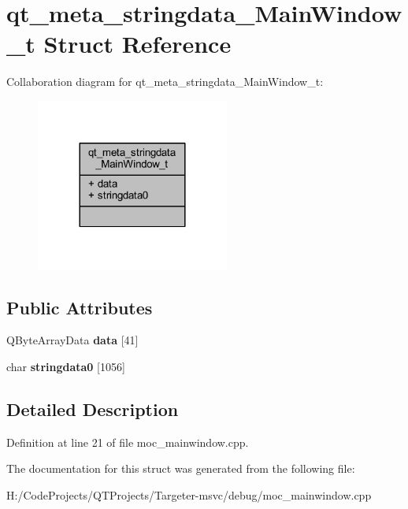 \hypertarget{structqt__meta__stringdata___main_window__t}{}\section{qt\+\_\+meta\+\_\+stringdata\+\_\+\+Main\+Window\+\_\+t Struct Reference}
\label{structqt__meta__stringdata___main_window__t}


Collaboration diagram for qt\+\_\+meta\+\_\+stringdata\+\_\+\+Main\+Window\+\_\+t\+:
\nopagebreak
\begin{figure}[H]
\begin{center}
\leavevmode
\includegraphics[width=180pt]{structqt__meta__stringdata___main_window__t__coll__graph}
\end{center}
\end{figure}
\subsection*{Public Attributes}
\begin{DoxyCompactItemize}
\item 
\mbox{\label{structqt__meta__stringdata___main_window__t_a1da75c3fb4448f99b656a5ca7a65897f}} 
Q\+Byte\+Array\+Data {\bfseries data} \mbox{[}41\mbox{]}
\item 
\mbox{\label{structqt__meta__stringdata___main_window__t_a839d87a6c9288dacfc295a89c4c212fd}} 
char {\bfseries stringdata0} \mbox{[}1056\mbox{]}
\end{DoxyCompactItemize}


\subsection{Detailed Description}


Definition at line 21 of file moc\+\_\+mainwindow.\+cpp.



The documentation for this struct was generated from the following file\+:\begin{DoxyCompactItemize}
\item 
H\+:/\+Code\+Projects/\+Q\+T\+Projects/\+Targeter-\/msvc/debug/moc\+\_\+mainwindow.\+cpp\end{DoxyCompactItemize}

